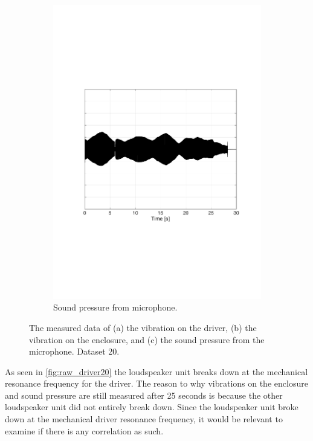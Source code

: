 \begin{figure}[H]
\begin{subfigure}[t]{0.3\textwidth}
	\includegraphics[width=1\textwidth]{figures/raw_microphone20.pdf}
	\caption{Sound pressure from microphone.}
	\label{fig:raw_microphone20}
\end{subfigure}
\caption{The measured data of (a) the vibration on the driver, (b) the vibration on the enclosure, and (c) the sound pressure from the microphone. Dataset 20.}
\label{fig:raw20}
\end{figure} 

As seen in \autoref{fig:raw_driver20} the loudspeaker unit breaks down at the mechanical resonance frequency for the driver. The reason to why vibrations on the enclosure and sound pressure are still measured after 25 seconds is because the other loudspeaker unit did not entirely break down. Since the loudspeaker unit broke down at the mechanical driver resonance frequency, it would be relevant to examine if there is any correlation as such.




